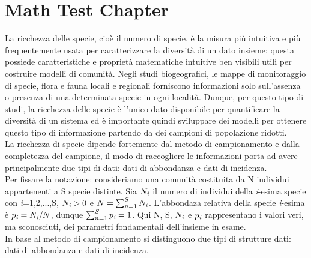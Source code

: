 \chapter{Math Test Chapter}\label{ch:mathtest} %


La ricchezza delle specie, cioè il numero di specie, è la misura più intuitiva e più frequentemente usata per caratterizzare la diversità di un dato insieme: questa possiede caratteristiche e proprietà matematiche intuitive ben visibili utili per costruire modelli di comunità. Negli studi biogeografici, le mappe di monitoraggio di specie, flora e fauna locali e regionali forniscono informazioni solo sull'assenza o presenza di una determinata specie in ogni località. Dunque, per questo tipo di studi, la ricchezza delle specie è l'unico dato disponibile per quantificare la diversità di un sistema ed è importante quindi sviluppare dei modelli per ottenere questo tipo di informazione partendo da dei campioni di popolazione ridotti.\\
La ricchezza di specie dipende fortemente dal metodo di campionamento e dalla completezza del campione, il modo di raccogliere le informazioni porta ad avere principalmente due tipi di dati: dati di abbondanza e dati di incidenza.\\
Per fissare la notazione: consideriamo una comunità costituita da N individui appartenenti a S specie distinte. Sia $N_\emph{i}$ il numero di individui della \emph{i}-esima specie con \emph{i}=1,2,...,S, $N_\emph{i}>0$ e $N=\sum_{n=1}^S N_\emph{i}$.
L'abbondaza relativa della specie \emph{i}-esima è $p_\emph{i}=N_\emph{i}/N$, dunque $\sum_{n=1}^S p_\emph{i}=1$. Qui N, S, $N_\emph{i}$ e $p_\emph{i}$ rappresentano i valori veri, ma sconosciuti, dei parametri fondamentali dell'insieme in esame.\\
In base al metodo di campionamento si distinguono due tipi di strutture dati: dati di abbondanza e dati di incidenza.

